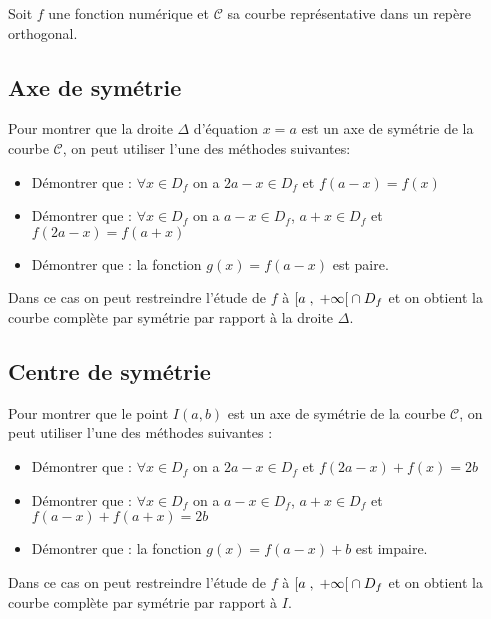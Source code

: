 
\everymath{\displaystyle}

 \summary{}
     
   
Soit $ f $ une fonction numérique et $ \mathcal{C} $ sa courbe représentative dans un repère orthogonal.

\subsection{Axe de symétrie}
Pour montrer que la droite $ \Delta $ d'équation $ x=a $ est un axe de symétrie de la courbe $ \mathcal{C} $,  on peut utiliser l'une des méthodes suivantes: 
\begin{itemize}
\item Démontrer que : $ \forall x\in D_{f}$  on a   $ 2a-x\in D_{f}$ et $ f(a-x)=f(x) $
\item Démontrer que : $ \forall x\in D_{f}$  on a  $ a-x\in D_{f}$, $ a+x\in D_{f}$ et $ f(2a-x)=f(a+x) $
\item Démontrer que : la fonction $ g(x)=f(a-x) $ est paire.
\end{itemize}
Dans ce cas on peut restreindre l'étude de $ f $ à $ \left[a \;,\; +\infty\right[\cap D_{f}$ et on obtient la courbe complète par symétrie par rapport à la droite $ \Delta $.

\subsection{Centre de symétrie}
Pour montrer que le point $ I(a, b) $ est un axe de symétrie de la courbe $ \mathcal{C} $,  on peut utiliser l'une des méthodes suivantes : 
\begin{itemize}
\item Démontrer que : $ \forall x\in D_{f}$  on a  $ 2a-x\in D_{f}$ et $ f(2a-x)+f(x)=2b $
\item Démontrer que : $ \forall x\in D_{f}$  on a   $ a-x\in D_{f}$,  $ a+x\in D_{f}$ et $ f(a-x)+f(a+x)=2b $
\item Démontrer que : la fonction $ g(x)=f(a-x)+b$ est impaire.
\end{itemize}
Dans ce cas on peut restreindre l'étude de $ f $ à $ \left[a \;,\; +\infty\right[\cap D_{f}$ et on obtient la courbe complète par symétrie par rapport à $ I. $

